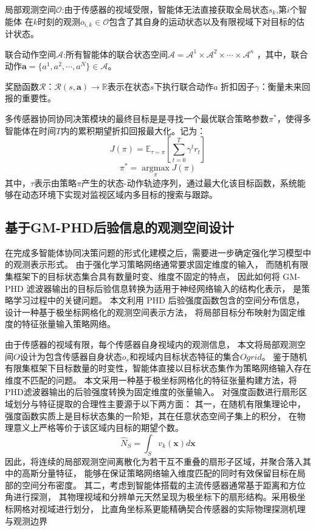 局部观测空间$\mathcal{O}$:由于传感器的视域受限，智能体无法直接获取全局状态$s_{k}$,第$i$个智能体
在$k$时刻的观测$o_{i,k}\in\mathcal{O}$包含了其自身的运动状态以及有限视域下对目标的估计状态。

联合动作空间$\mathcal{A}$:所有智能体的联合状态空间$\mathcal{A}=\mathcal{A}^{1}\times\mathcal{A}^{2}\times\cdots\times\mathcal{A}^{n}$
，其中，联合动作$\mathbf{a}=\{a^{1},a^{2},\cdots,a^{N}\}\in\mathcal{A}$。

奖励函数${\mathcal{R}}$：${\mathcal{R}}(s,\mathbf{a})\to\mathbb{R}$表示在状态$s$下执行联合动作$a$
折扣因子$\gamma$：衡量未来回报的重要性。

多传感器协同协同决策模块的最终目标是是寻找一个最优联合策略参数$\pi^\ast$，使得多智能体在时间$T$内的累积期望折扣回报最大化。记为：
\begin{equation}
J(\pi)=\mathbb{E}_{\tau\sim\pi}\left[\sum_{t=0}^T\gamma^tr_t\right]
\end{equation} 
\begin{equation}
\pi^{*}=\underset{\pi}{\operatorname*{\mathrm{argmax}}}J(\pi)
\end{equation}
其中，$\tau$表示由策略$\pi$产生的状态-动作轨迹序列，通过最大化该目标函数，系统能够在动态环境下实现对监视区域内多目标的搜索与跟踪。

\subsection{基于GM-PHD后验信息的观测空间设计}
在完成多智能体协同决策问题的形式化建模之后，需要进一步确定强化学习模型中的观测表示形式。
由于强化学习策略网络通常要求固定维度的输入，
而随机有限集框架下的目标状态集合具有数量时变、维度不固定的特点，
因此如何将 GM-PHD 滤波器输出的目标后验信息转换为适用于神经网络输入的结构化表示，
是策略学习过程中的关键问题。
本文利用 PHD 后验强度函数包含的空间分布信息，设计一种基于极坐标网格化的观测空间表示方法，
将局部目标分布映射为固定维度的特征张量输入策略网络。

由于传感器的视域有限，每个传感器自身视域内的观测信息，
本文将局部观测空间$O$设计为包含传感器自身状态${o}_{s}$和视域内目标状态特征的集合$O{grid}$。
鉴于随机有限集框架下目标数量的时变性，智能体直接以目标状态集作为策略网络输入存在维度不匹配的问题。
本文采用一种基于极坐标网格化的特征张量构建方法，将PHD滤波器输出的后验强度转换为固定维度的张量输入。
对强度函数进行扇形区域划分与特征提取的合理性主要源于以下两方面：
其一，在随机有限集理论中，强度函数实质上是目标状态集的一阶矩，其在任意状态空间子集上的积分，
在物理意义上严格等价于该区域内目标的期望个数。
\begin{equation}
\widehat{N}_{S}=\int_{S}v_{k}(\mathbf{x})d\mathbf{x}
\end{equation}
因此，将连续的局部观测空间离散化为若干互不重叠的扇形子区域，并聚合落入其中的高斯分量特征，
能够在保证策略网络输入维度匹配的同时有效保留目标在局部的空间分布密度。
其二，考虑到智能体搭载的主流传感器通常基于距离和方位角进行探测，
其物理视域和分辨单元天然呈现为极坐标下的扇形结构。采用极坐标网格对视域进行划分，
比直角坐标系更能精确契合传感器的实际物理探测机理与观测边界



